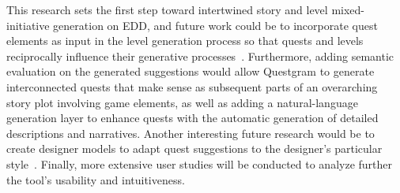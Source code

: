 




This research sets the first step toward intertwined story and level mixed-initiative generation on EDD, and future work could be to incorporate quest elements as input in the level generation process so that quests and levels reciprocally influence their generative processes~\cite{p8Liapis2019-OrchestratingGames}. Furthermore, adding semantic evaluation on the generated suggestions would allow Questgram to generate interconnected quests that make sense as subsequent parts of an overarching story plot involving game elements, as well as adding a natural-language generation layer to enhance quests with the automatic generation of detailed descriptions and narratives. Another interesting future research would be to create designer models to adapt quest suggestions to the designer's particular style~\cite{p8Liapis2013-designerModel,alvarez2020-designerpersonas}. Finally, more extensive user studies will be conducted to analyze further the tool's usability and intuitiveness. 









